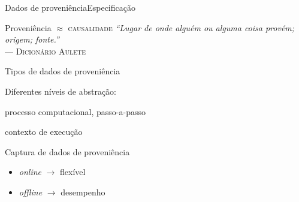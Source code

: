 \documentclass[12pt,compress]{beamer}
\newcommand{\nologo}{\setbeamertemplate{logo}{}} %
\begin{document}
{\nologo
\begin{frame}[t,squeeze]{Dados de proveniência}{Especificação}

\begin{alertblock}{Proveniência $\approx$ \textsc{causalidade}}
\textit{``Lugar de onde alguém ou alguma coisa provém; origem; fonte.''} \\
\hspace*{\fill}--- \textsc{Dicionário Aulete}
\end{alertblock}

\begin{exampleblock}{Tipos de dados de proveniência}
\centerline{Diferentes níveis de abstração:}
\begin{description}[retrospectiva]
\item[prospectiva] \alert{processo} computacional, passo-a-passo
\item[retrospectiva] contexto de \alert{execução}
\end{description}
\end{exampleblock}

\begin{block}{Captura de dados de proveniência}
\begin{itemize}
\item \textit{online} $\rightarrow$ flexível
\item \textit{offline} $\rightarrow$ desempenho
\end{itemize}
\end{block}

\end{frame}
}

\end{document}
